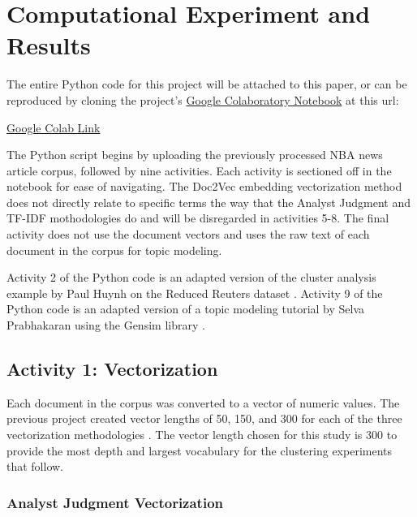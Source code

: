 \documentclass[5p,authoryear]{elsarticle}
\begin{document}
\section{Computational Experiment and Results}

The entire Python code for this project will be attached to this paper, or can be reproduced by cloning the project's \href{https://colab.research.google.com/drive/13FXvFBOhEdyr4pE_DFnIXSTYEzwBTkV_?usp=sharing}{Google Colaboratory Notebook} at this url:

\begin{displayquote}
\centering
\href{https://colab.research.google.com/drive/13FXvFBOhEdyr4pE_DFnIXSTYEzwBTkV_?usp=sharing}{Google Colab Link}
\end{displayquote}

The Python script begins by uploading the previously processed NBA news article corpus, followed by nine activities.
Each activity is sectioned off in the notebook for ease of navigating. 
The Doc2Vec embedding vectorization method does not directly relate to specific terms the way that the Analyst Judgment and TF-IDF mothodologies do and will be disregarded in activities 5-8. 
The final activity does not use the document vectors and uses the raw text of each document in the corpus for topic modeling.

Activity 2 of the Python code is an adapted version of the cluster analysis example by Paul Huynh on the Reduced Reuters dataset \citep{sample-code1}. 
Activity 9 of the Python code is an adapted version of a topic modeling tutorial by Selva Prabhakaran using the Gensim library \citep{sample-code2}. 



\subsection{Activity 1: Vectorization}\label{one}

Each document in the corpus was converted to a vector of numeric values. 
The previous project created vector lengths of 50, 150, and 300 for each of the three vectorization methodologies \citep{project2}.
The vector length chosen for this study is 300 to provide the most depth and largest vocabulary for the clustering experiments that follow.

\subsubsection{Analyst Judgment Vectorization}\label{judge}
\end{document}
